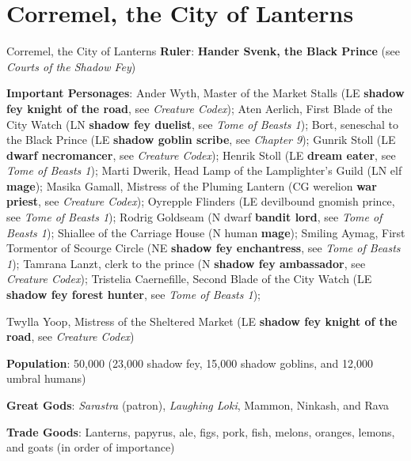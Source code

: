 \documentclass[10pt,a4paper,twoside,bg=print,twocolumn,openany,nodeprecatedcode]{dndbook}
\begin{document}
\section{Corremel, the City of Lanterns}
\begin{DndSidebar}[float=!b]{Corremel, the City of Lanterns}
\textbf{Ruler}: \textbf{Hander Svenk, the Black Prince} (see \textit{Courts of the Shadow Fey})



\textbf{Important Personages}: Ander Wyth, Master of the Market Stalls (LE \textbf{shadow fey knight of the road}, see \textit{Creature Codex}); Aten Aerlich, First Blade of the City Watch (LN \textbf{shadow fey duelist}, see \textit{Tome of Beasts 1}); Bort, seneschal to the Black Prince (LE \textbf{shadow goblin scribe}, see \textit{Chapter 9}); Gunrik Stoll (LE \textbf{dwarf necromancer}, see \textit{Creature Codex}); Henrik Stoll (LE \textbf{dream eater}, see \textit{Tome of Beasts 1}); Marti Dwerik, Head Lamp of the Lamplighter's Guild (LN elf \textbf{mage}); Masika Gamall, Mistress of the Pluming Lantern (CG werelion \textbf{war priest}, see \textit{Creature Codex}); Oyrepple Flinders (LE devilbound gnomish prince, see \textit{Tome of Beasts 1}); Rodrig Goldseam (N dwarf \textbf{bandit lord}, see \textit{Tome of Beasts 1}); Shiallee of the Carriage House (N human \textbf{mage}); Smiling Aymag, First Tormentor of Scourge Circle (NE \textbf{shadow fey enchantress}, see \textit{Tome of Beasts 1}); Tamrana Lanzt, clerk to the prince (N \textbf{shadow fey ambassador}, see \textit{Creature Codex}); Tristelia Caernefille, Second Blade of the City Watch (LE \textbf{shadow fey forest hunter}, see \textit{Tome of Beasts 1});



Twylla Yoop, Mistress of the Sheltered Market (LE \textbf{shadow fey knight of the road}, see \textit{Creature Codex})



\textbf{Population}: 50,000 (23,000 shadow fey, 15,000 shadow goblins, and 12,000 umbral humans)



\textbf{Great Gods}: \textit{Sarastra} (patron), \textit{Laughing Loki}, Mammon, Ninkash, and Rava



\textbf{Trade Goods}: Lanterns, papyrus, ale, figs, pork, fish, melons, oranges, lemons, and goats (in order of importance)





\end{DndSidebar}
\end{document}
